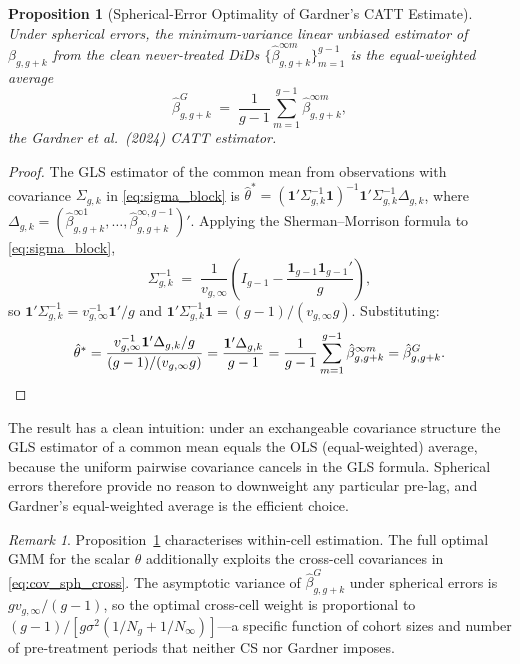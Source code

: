 \documentclass[12pt,letterpaper]{article}
\newtheorem{proposition}[theorem]{Proposition}
\theoremstyle{remark}
\newtheorem{remark}{Remark}[section]
\theoremstyle{definition}
\newcommand{\hbeta}{\hat{\beta}}
\begin{document}
\begin{proposition}[Spherical-Error Optimality of Gardner's CATT Estimate]
  \label{prop:gardner_opt}
  Under spherical errors, the minimum-variance linear unbiased estimator
  of $\beta_{g,g+k}$ from the clean never-treated DiDs
  $\{\hbeta^{\infty m}_{g,g+k}\}_{m=1}^{g-1}$ is the equal-weighted average
  \begin{equation}
    \hbeta^{G}_{g,g+k}
    \;=\;
    \frac{1}{g-1}\sum_{m=1}^{g-1}\hbeta^{\infty m}_{g,g+k},
    \label{eq:gardner_opt}
  \end{equation}
  the Gardner et al.\ (2024) CATT estimator.
\end{proposition}

\begin{proof}
  The GLS estimator of the common mean from observations with covariance
  $\Sigma_{g,k}$ in \eqref{eq:sigma_block} is
  $\hat\theta^{*}=(\mathbf{1}'\Sigma_{g,k}^{-1}\mathbf{1})^{-1}
  \mathbf{1}'\Sigma_{g,k}^{-1}\Delta_{g,k}$, where
  $\Delta_{g,k}=(\hbeta^{\infty1}_{g,g+k},\ldots,\hbeta^{\infty,g-1}_{g,g+k})'$.
  Applying the Sherman--Morrison formula to \eqref{eq:sigma_block},
  \[
    \Sigma_{g,k}^{-1}
    \;=\;
    \frac{1}{v_{g,\infty}}
    \!\left(I_{g-1}-\frac{\mathbf{1}_{g-1}\mathbf{1}_{g-1}'}{g}\right)\!,
  \]
  so $\mathbf{1}'\Sigma_{g,k}^{-1}=v_{g,\infty}^{-1}\mathbf{1}'/g$ and
  $\mathbf{1}'\Sigma_{g,k}^{-1}\mathbf{1}=(g-1)/(v_{g,\infty}g)$.
  Substituting:
  \[
    \hat\theta^{*}
    =
    \frac{v_{g,\infty}^{-1}\mathbf{1}'\Delta_{g,k}/g}{(g-1)/(v_{g,\infty}g)}
    =
    \frac{\mathbf{1}'\Delta_{g,k}}{g-1}
    =
    \frac{1}{g-1}\sum_{m=1}^{g-1}\hbeta^{\infty m}_{g,g+k}
    =\hbeta^{G}_{g,g+k}.\qedhere
  \]
\end{proof}

The result has a clean intuition: under an exchangeable covariance
structure the GLS estimator of a common mean equals the OLS (equal-weighted)
average, because the uniform pairwise covariance cancels in the GLS formula.
Spherical errors therefore provide no reason to downweight any particular
pre-lag, and Gardner's equal-weighted average is the efficient choice.

\begin{remark}
  Proposition~\ref{prop:gardner_opt} characterises within-cell estimation.
  The full optimal GMM for the scalar $\theta$ additionally exploits the
  cross-cell covariances in \eqref{eq:cov_sph_cross}. The asymptotic
  variance of $\hbeta^G_{g,g+k}$ under spherical errors is
  $gv_{g,\infty}/(g-1)$, so the optimal cross-cell weight is proportional
  to $(g-1)/[g\sigma^2(1/N_g+1/N_\infty)]$---a specific function of
  cohort sizes and number of pre-treatment periods that neither CS nor
  Gardner imposes.
\end{remark}
\end{document}
